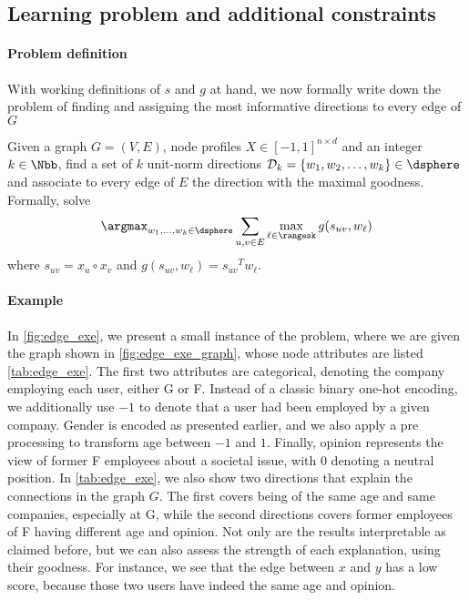 \subsection{Learning problem and additional constraints}
\label{sub:edge_constraints}

\paragraph{Problem definition}

With working definitions of $s$ and $g$ at hand, we now formally write down the problem of
finding and assigning the most informative directions to every edge of $G$
\begin{problem}[\ecp{}]
  \label{p:edge_full}
  Given a graph $G=(V, E)$, node profiles $X\in [-1, 1]^{n\times d}$ and an integer $k \in \Nbb$,
  find a set of $k$ unit-norm directions $\mathcal{D}_k = \{w_1, w_2, \ldots, w_k\} \in \dsphere$
  and associate to every edge of $E$ the direction with the maximal goodness. Formally, solve
  \begin{equation}
    \label{eq:edge_full}
    \argmax_{w_1,\ldots,w_k \in \dsphere}
    \sum_{u,v \in E} \max_{\ell \in \rangesk} g(s_{uv}, w_{\ell})
  \end{equation}
  where $s_{uv} = x_u \circ x_v$ and $g(s_{uv}, w_{\ell}) = {s_{uv}}^T w_{\ell}$.
\end{problem}

\paragraph{Example}

In \autoref{fig:edge_exe}, we present a small instance of the \ecp{} problem, where we are given the
graph shown in \autoref{fig:edge_exe_graph}, whose node attributes are listed
\autoref{tab:edge_exe}. The first two attributes are categorical, denoting the company employing
each user, either \textsf{G} or \textsf{F}. Instead of a classic binary one-hot encoding, we
additionally use $-1$ to denote that a user had been employed by a given company. \textsf{Gender} is
encoded as presented earlier, and we also apply a pre processing to transform \textsf{age} between
$-1$ and $1$. Finally, \textsf{opinion} represents the view of former \textsf{F} employees about a
societal issue, with $0$ denoting a neutral position. In \autoref{tab:edge_exe}, we also show two
directions that explain the connections in the graph $G$. The first covers being of the same age and
same companies, especially at \textsf{G}, while the second directions covers former employees of
\textsf{F} having different \textsf{age} and \textsf{opinion}. Not only are the results
interpretable as claimed before, but we can also assess the strength of each explanation, using
their goodness. For instance, we see that the edge between $x$ and $y$ has a low score, because
those two users have indeed the same \textsf{age} and \textsf{opinion}.

